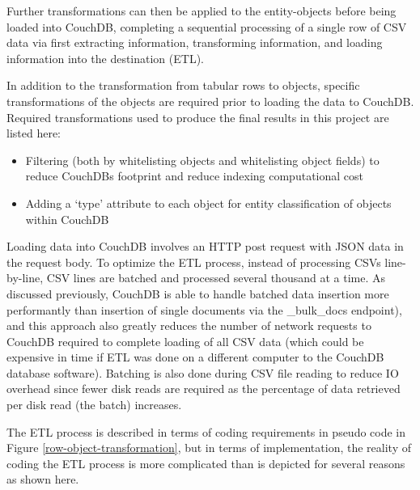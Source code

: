 Further transformations can then be applied to the entity-objects before being loaded into CouchDB, completing a sequential processing of a single row of CSV data via first extracting information, transforming information, and loading information into the destination (ETL).

In addition to the transformation from tabular rows to objects, specific transformations of the objects are required prior to loading the data to CouchDB. Required transformations used to produce the final results in this project are listed here:

\begin{itemize}
  \item Filtering (both by whitelisting objects and whitelisting object fields) to reduce CouchDBs footprint and reduce indexing computational cost
  \item Adding a `type' attribute to each object for entity classification of objects within CouchDB
\end{itemize}

Loading data into CouchDB involves an HTTP post request with JSON data in the request body. To optimize the ETL process, instead of processing CSVs line-by-line, CSV lines are batched and processed several thousand at a time. As discussed previously, CouchDB is able to handle batched data insertion more performantly than insertion of single documents via the \_bulk\_docs endpoint), and this approach also greatly reduces the number of network requests to CouchDB required to complete loading of all CSV data (which could be expensive in time if ETL was done on a different computer to the CouchDB database software). Batching is also done during CSV file reading to reduce IO overhead since fewer disk reads are required as the percentage of data retrieved per disk read (the batch) increases.

The ETL process is described in terms of coding requirements in pseudo code in Figure \ref{row-object-transformation}, but in terms of implementation, the reality of coding the ETL process is more complicated than is depicted for several reasons as shown here.


